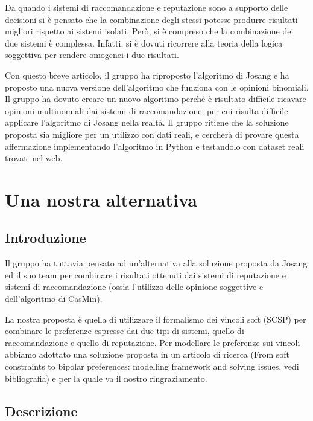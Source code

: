 \documentclass[letterpaper]{article} %
\begin{document}
Da quando i sistemi di raccomandazione e reputazione sono a supporto
delle decisioni si è pensato che la combinazione degli stessi potesse
produrre risultati migliori rispetto ai sistemi isolati. Però, si è
compreso che la combinazione dei due sistemi è complessa. Infatti, si è dovuti
ricorrere alla teoria della logica soggettiva per rendere omogenei i due
risultati. 

Con questo breve articolo, il gruppo ha riproposto
l'algoritmo di Josang e ha proposto una nuova versione dell'algoritmo
che funziona con le opinioni binomiali. Il gruppo ha dovuto creare un
nuovo algoritmo perché è risultato difficile ricavare opinioni
multinomiali dai sistemi di raccomandazione; per cui risulta difficile
applicare l'algoritmo di Josang nella realtà. Il gruppo ritiene che la
soluzione proposta sia migliore per un utilizzo con dati reali, e
cercherà di provare questa affermazione implementando l'algoritmo in
Python e testandolo con dataset reali trovati nel web.

\hypertarget{header-n226}{%
	\section{Una nostra alternativa}\label{header-n226}}

\hypertarget{header-n227}{%
	\subsection{Introduzione}\label{header-n227}}

Il gruppo ha tuttavia pensato ad un'alternativa alla soluzione proposta da Josang ed il suo team per combinare i risultati ottenuti dai sistemi di reputazione e sistemi di raccomandazione (ossia l'utilizzo delle opinione soggettive e dell'algoritmo di CasMin).

La nostra proposta è quella di utilizzare il formalismo dei vincoli soft (SCSP) per combinare le preferenze espresse dai due tipi di sistemi, quello di raccomandazione e quello di reputazione. Per modellare le preferenze sui vincoli abbiamo adottato una soluzione proposta in un articolo di ricerca (From soft constraints to bipolar preferences: modelling framework and solving issues, vedi bibliografia) e per la quale va il nostro ringraziamento.


\hypertarget{header-n230}{%
	\subsection{Descrizione}\label{header-n230}}
\end{document}
